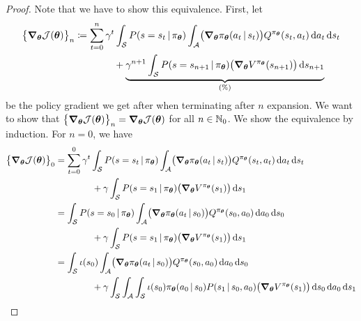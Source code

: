 \begin{proof}
			Note that we have to show this equivalence. First, let
			\begin{align}
				\bigl\{ \grad_{\bm{\theta}} \mathcal{J}(\bm{\theta}) \bigr\}_n
					&\coloneqq \sum_{t = 0}^{n} \gamma^t \int_{\mathcal{S}} P(s = s_t \,\vert\, \pi_{\bm{\theta}}) \int_{\mathcal{A}} \bigl( \grad_{\bm{\theta}} \pi_{\bm{\theta}}(a_t \,\vert\, s_t) \bigr) Q^{\pi_{\bm{\theta}}}(s_t, a_t) \dd{a_t} \dd{s_t} \\&\qquad\qquad
						+ \underbrace{\gamma^{n + 1} \int_\mathcal{S} P(s = s_{n + 1} \,\vert\, \pi_{\bm{\theta}}) \bigl( \grad_{\bm{\theta}} V^{\pi_{\bm{\theta}}}(s_{n + 1}) \bigr) \dd{s_{n + 1}}}_{(\%)}  \label{eq:pgtProofSum}
			\end{align}
			be the policy gradient we get after when terminating after \(n\) expansion. We want to show that \( \bigl\{ \grad_{\bm{\theta}} \mathcal{J}(\bm{\theta}) \bigr\}_n = \grad_{\bm{\theta}} \mathcal{J}(\bm{\theta}) \) for all \( n \in \mathbb{N}_0 \). We show the equivalence by induction. For \(n = 0\), we have
			\begin{align}
				\bigl\{ \grad_{\bm{\theta}} \mathcal{J}(\bm{\theta}) \bigr\}_0
					&= \sum_{t = 0}^{0} \gamma^t \int_{\mathcal{S}} P(s = s_t \,\vert\, \pi_{\bm{\theta}}) \int_{\mathcal{A}} \bigl( \grad_{\bm{\theta}} \pi_{\bm{\theta}}(a_t \,\vert\, s_t) \bigr) Q^{\pi_{\bm{\theta}}}(s_t, a_t) \dd{a_t} \dd{s_t} \\&\qquad\qquad
						+ \gamma \int_\mathcal{S} P(s = s_1 \,\vert\, \pi_{\bm{\theta}}) \bigl( \grad_{\bm{\theta}} V^{\pi_{\bm{\theta}}}(s_1) \bigr) \dd{s_1} \\
					&= \int_{\mathcal{S}} P(s = s_0 \,\vert\, \pi_{\bm{\theta}}) \int_{\mathcal{A}} \bigl( \grad_{\bm{\theta}} \pi_{\bm{\theta}}(a_t \,\vert\, s_0) \bigr) Q^{\pi_{\bm{\theta}}}(s_0, a_0) \dd{a_0} \dd{s_0} \\&\qquad\qquad
						+ \gamma \int_\mathcal{S} P(s = s_1 \,\vert\, \pi_{\bm{\theta}}) \bigl( \grad_{\bm{\theta}} V^{\pi_{\bm{\theta}}}(s_1) \bigr) \dd{s_1} \\
					&= \int_{\mathcal{S}} \iota(s_0) \int_{\mathcal{A}} \bigl( \grad_{\bm{\theta}} \pi_{\bm{\theta}}(a_t \,\vert\, s_0) \bigr) Q^{\pi_{\bm{\theta}}}(s_0, a_0) \dd{a_0} \dd{s_0} \\&\qquad\qquad
						+ \gamma \int_\mathcal{S} \int_\mathcal{A} \int_\mathcal{S} \iota(s_0) \pi_{\bm{\theta}}(a_0 \,\vert\, s_0) P(s_1 \,\vert\, s_0, a_0) \bigl( \grad_{\bm{\theta}} V^{\pi_{\bm{\theta}}}(s_1) \bigr) \dd{s_0} \dd{a_0} \dd{s_1}
			\end{align}

\end{proof}
